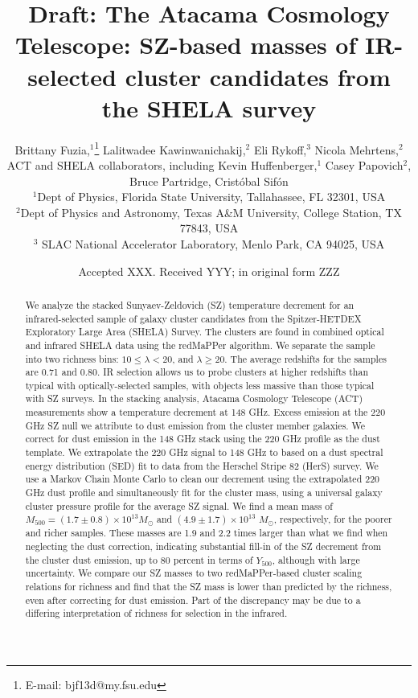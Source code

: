 \documentclass[a4paper,fleqn,usenatbib]{mnras}
\title[SZ effect in SHELA cluster candidates]{Draft: The Atacama Cosmology Telescope: SZ-based masses of IR-selected cluster candidates from the SHELA survey}
\author[B. Fuzia et al.]{
Brittany Fuzia,$^{1}$\thanks{E-mail: bjf13d@my.fsu.edu}
Lalitwadee Kawinwanichakij,$^{2}$
Eli Rykoff,$^{3}$
Nicola Mehrtens,$^{2}$
\newauthor ACT and SHELA collaborators, 
including
Kevin Huffenberger,$^1$ 
Casey Papovich$^{2}$, 
\newauthor Bruce Partridge, Crist\'obal Sif\'on
\\
$^{1}$Dept of Physics, Florida State University, Tallahassee, FL 32301, USA\\
$^{2}$Dept of Physics and Astronomy, Texas A\&M University, College Station, TX 77843, USA\\
$^{3}$ SLAC National Accelerator Laboratory, Menlo Park, CA 94025, USA\\
}
\date{Accepted XXX. Received YYY; in original form ZZZ}
\begin{document}
\label{firstpage}
\pagerange{\pageref{firstpage}--\pageref{lastpage}}
\maketitle

\begin{abstract}
We analyze the stacked Sunyaev-Zeldovich (SZ) temperature decrement for an infrared-selected sample of galaxy cluster candidates from the Spitzer-HETDEX Exploratory Large Area (SHELA) Survey. The clusters are found in combined optical and infrared SHELA data using the redMaPPer algorithm. We separate the sample into two richness bins: $10 \leq \lambda < 20$, and $\lambda \geq 20$. The average redshifts for the samples are 0.71 and 0.80. IR selection allows us to probe clusters at higher redshifts than typical with optically-selected samples, with objects less massive than those typical with SZ surveys. In the stacking analysis, Atacama Cosmology Telescope (ACT) measurements show a temperature decrement at 148 GHz.  Excess emission at the 220 GHz SZ null we attribute to dust emission from the cluster member galaxies. We correct for dust emission in the 148 GHz stack using the 220 GHz profile as the dust template. We extrapolate the 220 GHz signal to 148 GHz to based on a dust spectral energy distribution (SED) fit to data from the Herschel Stripe 82 (HerS) survey.  We use a Markov Chain Monte Carlo to clean our decrement using the extrapolated 220 GHz dust profile and simultaneously fit for the cluster mass, using a universal galaxy cluster pressure profile for the average SZ signal.  We find a mean mass of $M_{500} = (1.7 \pm 0.8)\times 10^{13} M_{\odot}$ and $(4.9 \pm 1.7) \times 10^{13}$ $M_{\odot}$, respectively, for the poorer and richer samples. These masses are 1.9 and 2.2 times larger than what we find when neglecting the dust correction, indicating substantial fill-in of the SZ decrement from the cluster dust emission, up to 80 percent in terms of $Y_{500}$, although with large uncertainty. We compare our SZ masses to two redMaPPer-based cluster scaling relations for richness and find that the SZ mass is lower than predicted by the richness, even after correcting for dust emission.  Part of the discrepancy may be due to a differing interpretation of richness for selection in the infrared.
\end{abstract}

\begin{keywords}

\end{keywords}
\end{document}
